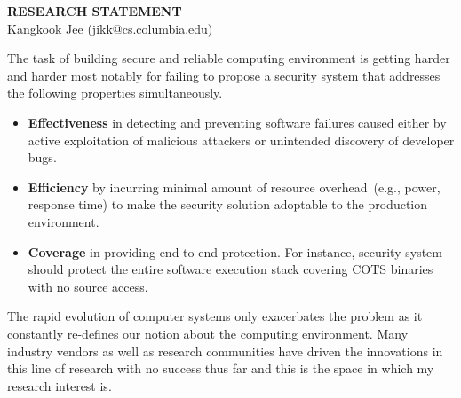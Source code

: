 \documentclass[letterpaper, 10pt]{article}
\begin{document}
\begin{small}

\begin{center}
{\LARGE \bf RESEARCH STATEMENT}\\
\vspace*{0.1cm}
{\normalsize Kangkook Jee (jikk@cs.columbia.edu)}
\end{center}



The task of building secure and reliable computing environment is getting
harder and harder most notably for failing to propose a security system that
addresses the following properties simultaneously.

\begin{itemize}

        \item {\bf Effectiveness} in detecting and preventing software failures
                caused either by active exploitation of malicious attackers or
                unintended discovery of developer bugs.

        \item {\bf Efficiency} by incurring minimal amount of resource
                overhead~(e.g., power, response time) to make the security
                solution adoptable to the production environment.

        \item {\bf Coverage} in providing end-to-end protection. For instance,
                security system should protect the entire software execution
                stack covering COTS binaries with no source access.

\end{itemize}

The rapid evolution of computer systems only exacerbates the problem as it
constantly re-defines our notion about the computing environment.
%
Many industry vendors as well as research communities have driven the
innovations in this line of research with no success thus far and this is the
space in which my research interest is.


\end{small}
\end{document}
